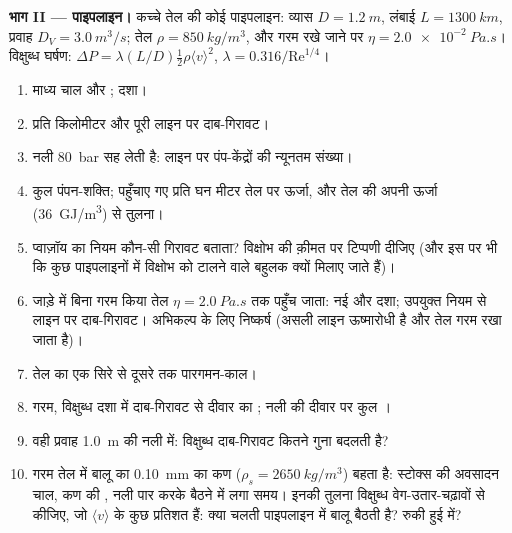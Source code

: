 \begin{problem}
\medskip
\noindent\textbf{भाग II --- पाइपलाइन।}
कच्चे तेल की कोई पाइपलाइन: व्यास $D = \qty{1.2}{m}$, लंबाई $L = \qty{1300}{km}$,
प्रवाह $D_V = \qty{3.0}{m^3/s}$; तेल $\rho = \qty{850}{kg/m^3}$, और गरम रखे जाने पर $\eta =
\qty{2.0e-2}{Pa.s}$। विक्षुब्ध घर्षण: $\Delta P = \lambda
(L/D)\tfrac12\rho\langle v\rangle^2$, $\lambda = 0.316/\mathrm{Re}^{1/4}$।
\begin{enumerate}[resume]
  \item माध्य चाल और ; दशा।
  \item प्रति किलोमीटर और पूरी लाइन पर दाब-गिरावट।
  \item नली \qty{80}{bar} सह लेती है: लाइन पर पंप-केंद्रों की
        न्यूनतम संख्या।
  \item कुल पंपन-शक्ति; पहुँचाए गए प्रति घन मीटर तेल पर ऊर्जा,
        और तेल की अपनी ऊर्जा (\qty{36}{GJ/m^3}) से तुलना।
  \item प्वाज़ॉय का नियम कौन-सी गिरावट बताता? विक्षोभ की क़ीमत पर
        टिप्पणी दीजिए (और इस पर भी कि कुछ पाइपलाइनों में विक्षोभ को
        टालने वाले बहुलक क्यों मिलाए जाते हैं)।
  \item जाड़े में बिना गरम किया तेल $\eta = \qty{2.0}{Pa.s}$ तक पहुँच जाता:
        नई  और दशा; उपयुक्त नियम से लाइन पर
        दाब-गिरावट। अभिकल्प के लिए निष्कर्ष (असली
        लाइन ऊष्मारोधी है और तेल गरम रखा जाता है)।
  \item तेल का एक सिरे से दूसरे तक पारगमन-काल।
  \item गरम, विक्षुब्ध दशा में दाब-गिरावट से दीवार का ; नली की दीवार पर कुल ।
  \item वही प्रवाह \qty{1.0}{m} की नली में: विक्षुब्ध दाब-गिरावट कितने
        गुना बदलती है?
  \item गरम तेल में बालू का \qty{0.10}{mm} का कण ($\rho_s = \qty{2650}{kg/m^3}$)
        बहता है: स्टोक्स की अवसादन चाल, कण की , नली पार करके बैठने में लगा समय। इनकी तुलना
        विक्षुब्ध वेग-उतार-चढ़ावों से कीजिए, जो $\langle v
        \rangle$ के कुछ प्रतिशत हैं: क्या चलती पाइपलाइन में बालू बैठती है? रुकी
        हुई में?
\end{enumerate}


\end{problem}
